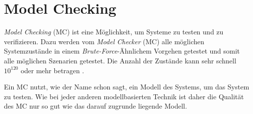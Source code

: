 \section{Model Checking}\label{sec:modelchecking}

\emph{Model Checking} (MC) ist eine Möglichkeit, um Systeme zu testen und zu verifizieren. Dazu werden vom \emph{Model Checker} (MC) alle möglichen Systemzustände in einem \emph{Brute-Force}-Ähnlichem Vorgehen getestet und somit alle möglichen Szenarien getestet. Die Anzahl der Zustände kann sehr schnell $ 10^{120} $ oder mehr betragen \cite{Grumberg1999,Baier2008}.

Ein MC nutzt, wie der Name schon sagt, ein Modell des Systems, um das System zu testen. Wie bei jeder anderen modellbasierten Technik ist daher die Qualität des MC nur so gut wie das darauf zugrunde liegende Modell.